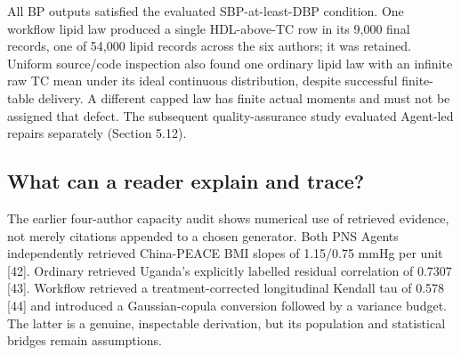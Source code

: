 \documentclass[11pt,letterpaper]{article}
\begin{document}
All BP outputs satisfied the evaluated SBP-at-least-DBP condition. One workflow lipid law produced a single HDL-above-TC row in its 9,000 final records, one of 54,000 lipid records across the six authors; it was retained. Uniform source/\allowbreak{}code inspection also found one ordinary lipid law with an infinite raw TC mean under its ideal continuous distribution, despite successful finite-table delivery. A different capped law has finite actual moments and must not be assigned that defect. The subsequent quality-assurance study evaluated Agent-led repairs separately (Section 5.12).


\subsection{What can a reader explain and trace?}

The earlier four-author capacity audit shows numerical use of retrieved evidence, not merely citations appended to a chosen generator. Both PNS Agents independently retrieved China-PEACE BMI slopes of 1.15/\allowbreak{}0.75 mmHg per unit [42]. Ordinary retrieved Uganda's explicitly labelled residual correlation of 0.7307 [43]. Workflow retrieved a treatment-corrected longitudinal Kendall tau of 0.578 [44] and introduced a Gaussian-copula conversion followed by a variance budget. The latter is a genuine, inspectable derivation, but its population and statistical bridges remain assumptions.


\FloatBarrier

\begingroup

\small

\renewcommand{\arraystretch}{1.22}
\end{document}

